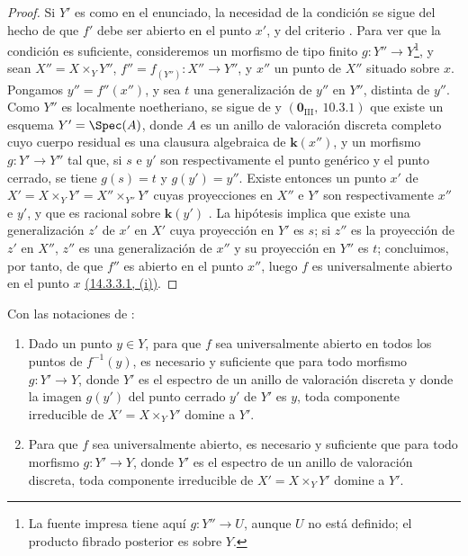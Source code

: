 \begin{proof}
Si $Y'$ es como en el enunciado, la necesidad de la condición se sigue del hecho de que $f'$ debe ser abierto en el punto $x'$, y del criterio .
Para ver que la condición es suficiente, consideremos un morfismo de tipo finito $g:Y''\to Y$\footnote{La fuente impresa tiene aquí $g:Y''\to U$, aunque $U$ no está definido; el producto fibrado posterior es sobre $Y$.}, y sean $X''=X\times_Y Y''$, $f''=f_{(Y'')}:X''\to Y''$, y $x''$ un punto de $X''$ situado sobre $x$.
Pongamos $y''=f''(x'')$, y sea $t$ una generalización de $y''$ en $Y''$, distinta de $y''$.
Como $Y''$ es localmente noetheriano, se sigue de  y $(\mathbf{0}_{\mathrm{III}},~10.3.1)$ que existe un esquema $Y'=\Spec(A)$, donde $A$ es un anillo de valoración discreta completo cuyo cuerpo residual es una clausura algebraica de $\boldsymbol k(x'')$, y un morfismo $g:Y'\to Y''$ tal que, si $s$ e $y'$ son respectivamente el punto genérico y el punto cerrado, se tiene $g(s)=t$ y $g(y')=y''$.
Existe entonces un punto $x'$ de $X'=X\times_Y Y'=X''\times_{Y''}Y'$ cuyas proyecciones en $X''$ e $Y'$ son respectivamente $x''$ e $y'$, y que es racional sobre $\boldsymbol k(y')$ .
La hipótesis implica que existe una generalización $z'$ de $x'$ en $X'$ cuya proyección en $Y'$ es $s$; si $z''$ es la proyección de $z'$ en $X''$, $z''$ es una generalización de $x''$ y su proyección en $Y''$ es $t$; concluimos, por tanto, de  que $f''$ es abierto en el punto $x''$, luego $f$ es universalmente abierto en el punto $x$ {\hyperlink{ega4.c04.subsec.14-3-3-1}{(14.3.3.1, (i))}}.
\end{proof}

\begin{corollary}[14.3.7]
\label{IV.14.3.7}
Con las notaciones de :
\begin{enumerate}[label=\textup{(\roman*)}]
  \item Dado un punto $y\in Y$, para que $f$ sea universalmente abierto en todos los puntos de $f^{-1}(y)$, es necesario y suficiente que para todo morfismo $g:Y'\to Y$, donde $Y'$ es el espectro de un anillo de valoración discreta y donde la imagen $g(y')$ del punto cerrado $y'$ de $Y'$ es $y$, toda componente irreducible de $X'=X\times_Y Y'$ domine a $Y'$.
  \item Para que $f$ sea universalmente abierto, es necesario y suficiente que para todo morfismo $g:Y'\to Y$, donde $Y'$ es el espectro de un anillo de valoración discreta, toda componente irreducible de $X'=X\times_Y Y'$ domine a $Y'$.
\end{enumerate}
\end{corollary}

